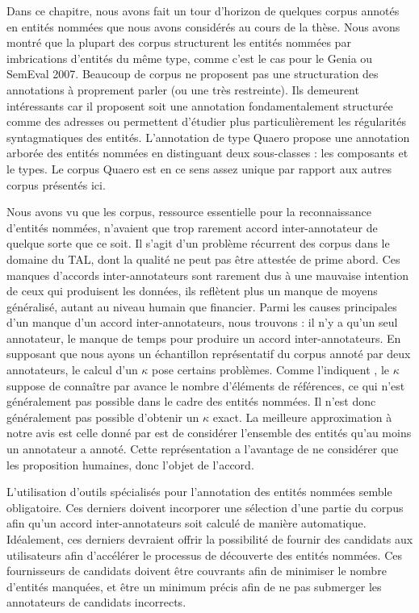 \documentclass[PhD-Yoann-Dupont.tex]{subfiles}
\begin{document}
Dans ce chapitre, nous avons fait un tour d'horizon de quelques corpus annotés en entités nommées que nous avons considérés au cours de la thèse. Nous avons montré que la plupart des corpus structurent les entités nommées par imbrications d'entités du même type, comme c'est le cas pour le Genia ou SemEval 2007. Beaucoup de corpus ne proposent pas une structuration des annotations à proprement parler (ou une très restreinte). Ils demeurent intéressants car il proposent soit une annotation fondamentalement structurée comme des adresses ou permettent d'étudier plus particulièrement les régularités syntagmatiques des entités. L'annotation de type Quaero propose une annotation arborée des entités nommées en distinguant deux sous-classes : les composants et le types. Le corpus Quaero est en ce sens assez unique par rapport aux autres corpus présentés ici.

Nous avons vu que les corpus, ressource essentielle pour la reconnaissance d'entités nommées, n'avaient que trop rarement accord inter-annotateur de quelque sorte que ce soit. Il s'agit d'un problème récurrent des corpus dans le domaine du TAL, dont la qualité ne peut pas être attestée de prime abord. Ces manques d'accords inter-annotateurs sont rarement dus à une mauvaise intention de ceux qui produisent les données, ils reflètent plus un manque de moyens généralisé, autant au niveau humain que financier. Parmi les causes principales d'un manque d'un accord inter-annotateurs, nous trouvons : il n'y a qu'un seul annotateur, le manque de temps pour produire un accord inter-annotateurs. En supposant que nous ayons un échantillon représentatif du corpus annoté par deux annotateurs, le calcul d'un $\kappa$ pose certains problèmes. Comme l'indiquent \citet{alex2010agile,grouin2011proposal}, le $\kappa$ suppose de connaître par avance le nombre d'éléments de références, ce qui n'est généralement pas possible dans le cadre des entités nommées. Il n'est donc généralement pas possible d'obtenir un $\kappa$ exact. La meilleure approximation à notre avis est celle donné par \citet{grouin2011proposal} est de considérer l'ensemble des entités qu'au moins un annotateur a annoté. Cette représentation a l'avantage de ne considérer que les proposition humaines, donc l'objet de l'accord.

L'utilisation d'outils spécialisés pour l'annotation des entités nommées semble obligatoire. Ces derniers doivent incorporer une sélection d'une partie du corpus afin qu'un accord inter-annotateurs soit calculé de manière automatique. Idéalement, ces derniers devraient offrir la possibilité de fournir des candidats aux utilisateurs afin d'accélérer le processus de découverte des entités nommées. Ces fournisseurs de candidats doivent être couvrants afin de minimiser le nombre d'entités manquées, et être un minimum précis afin de ne pas submerger les annotateurs de candidats incorrects.
\end{document}
